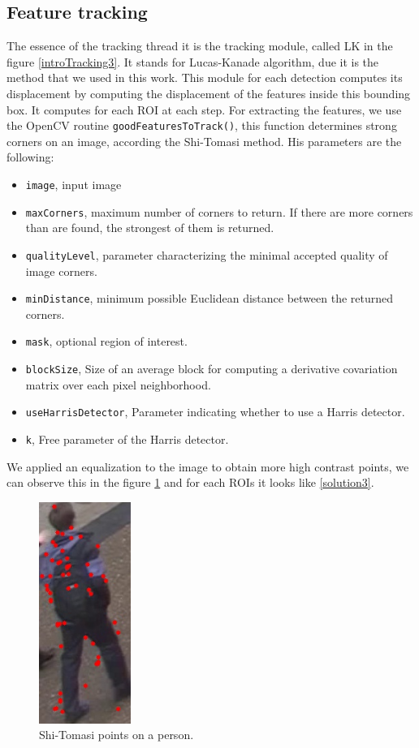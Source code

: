 \subsection{Feature tracking}




The essence of the tracking thread it is the tracking module, called LK in the figure \ref{introTracking3}. It stands for Lucas-Kanade algorithm, due it is the method that we used in this work. This module for each detection computes its displacement by computing the displacement of the features inside this bounding box. It computes for each ROI at each step. For extracting the features, we use the OpenCV routine \texttt{goodFeaturesToTrack()}, this function determines strong corners on an image, according the Shi-Tomasi method. His parameters are the following:
 
\begin{itemize}

\item \texttt{image}, input image

\item \texttt{maxCorners}, maximum number of corners to return. If there are more corners than are found, the strongest of them is returned.
\item \texttt{qualityLevel}, parameter characterizing the minimal accepted quality of image corners.
\item \texttt{minDistance}, minimum possible Euclidean distance between the returned corners.
\item \texttt{mask}, optional region of interest.
\item \texttt{blockSize}, Size of an average block for computing a derivative covariation matrix over each pixel neighborhood.
\item \texttt{useHarrisDetector},  Parameter indicating whether to use a Harris detector.
\item \texttt{k},  Free parameter of the Harris detector.

\end{itemize}

We applied an equalization to the image to obtain more high contrast points, we can observe this in the figure \ref{solution2} and for each ROIs it looks like \ref{solution3}.


\begin{figure}[H]
\centering         
\includegraphics[width=3cm]{implementation/pointsEQU.jpg}
\caption{Shi-Tomasi points on a person.} \label{solution2}
\end{figure}

